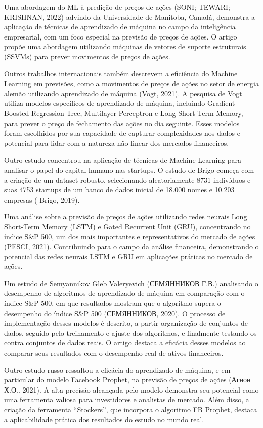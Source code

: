 \documentclass[
]{article}
\begin{document}
Uma abordagem do ML à predição de preços de ações (SONI; TEWARI;
KRISHNAN, 2022) advindo da Universidade de Manitoba, Canadá, demonstra a
aplicação de técnicas de aprendizado de máquina no campo da inteligência
empresarial, com um foco especial na previsão de preços de ações. O
artigo propõe uma abordagem utilizando máquinas de vetores de suporte
estruturais (SSVMs) para prever movimentos de preços de ações.

Outros trabalhos internacionais também descrevem a eficiência do Machine
Learning em previsões, como a movimentos de preços de ações no setor de
energia alemão utilizando aprendizado de máquina (Vogt, 2021). A
pesquisa de Vogt utiliza modelos específicos de aprendizado de máquina,
incluindo Gradient Boosted Regression Tree, Multilayer Perceptron e Long
Short-Term Memory, para prever o preço de fechamento das ações no dia
seguinte. Esses modelos foram escolhidos por sua capacidade de capturar
complexidades nos dados e potencial para lidar com a natureza não linear
dos mercados financeiros.

Outro estudo concentrou na aplicação de técnicas de Machine Learning
para analisar o papel do capital humano nas startups. O estudo de Brigo
começa com a criação de um dataset robusto, selecionando aleatoriamente
8731 indivíduos e suas 4753 startups de um banco de dados inicial de
18.000 nomes e 10.203 empresas ( Brigo, 2019).

Uma análise sobre a previsão de preços de ações utilizando redes neurais
Long Short-Term Memory (LSTM) e Gated Recurrent Unit (GRU), concentrando
no índice S\&P 500, um dos mais importantes e representativos do mercado
de ações (PESCI, 2021). Contribuindo para o campo da análise financeira,
demonstrando o potencial das redes neurais LSTM e GRU em aplicações
práticas no mercado de ações.

Um estudo de Semyannikov Gleb Valeryevich (СЕМЯННИКОВ Г.В.) analisando o
desempenho de algoritmos de aprendizado de máquina em comparação com o
índice S\&P 500, em que resultados mostram que o algoritmo supera o
desempenho do índice S\&P 500 (СЕМЯННИКОВ, 2020). O processo de
implementação desses modelos é descrito, a partir organização de
conjuntos de dados, seguido pelo treinamento e ajuste dos algoritmos, e
finalmente testando-os contra conjuntos de dados reais. O artigo destaca
a eficácia desses modelos ao comparar seus resultados com o desempenho
real de ativos financeiros.

Outro estudo russo ressaltou a eficácia do aprendizado de máquina, e em
particular do modelo Facebook Prophet, na previsão de preços de ações
(Агнон Х.О.. 2021). A alta precisão alcançada pelo modelo demonstra seu
potencial como uma ferramenta valiosa para investidores e analistas de
mercado. Além disso, a criação da ferramenta ``Stockers'', que incorpora
o algoritmo FB Prophet, destaca a aplicabilidade prática dos resultados
do estudo no mundo real.
\end{document}
